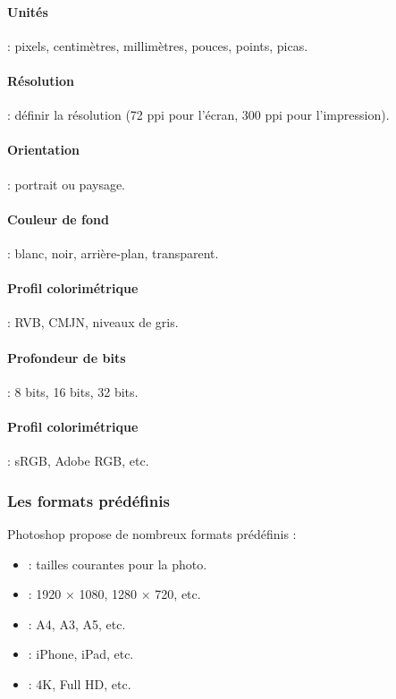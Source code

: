 \paragraph{Unités} : pixels, centimètres, millimètres, pouces, points, picas.

\paragraph{Résolution} : définir la résolution (72 ppi pour l'écran, 300 ppi pour l'impression).

\paragraph{Orientation} : portrait ou paysage.

\paragraph{Couleur de fond} : blanc, noir, arrière-plan, transparent.

\paragraph{Profil colorimétrique} : RVB, CMJN, niveaux de gris.

\paragraph{Profondeur de bits} : 8 bits, 16 bits, 32 bits.

\paragraph{Profil colorimétrique} : sRGB, Adobe RGB, etc.

\subsubsection{Les formats prédéfinis}

Photoshop propose de nombreux formats prédéfinis :

\begin{itemize}
    \item {} : tailles courantes pour la photo.
    \item {} : 1920 × 1080, 1280 × 720, etc.
    \item {} : A4, A3, A5, etc.
    \item {} : iPhone, iPad, etc.
    \item {} : 4K, Full HD, etc.
\end{itemize}

